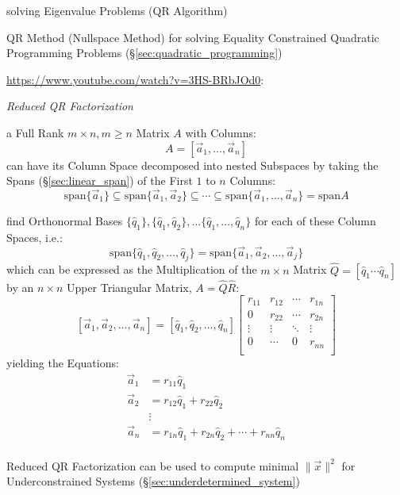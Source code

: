solving Eigenvalue Problems (QR Algorithm)

\fist QR Method (Nullspace Method) for solving Equality Constrained Quadratic
Programming Problems (\S\ref{sec:quadratic_programming})


\url{https://www.youtube.com/watch?v=3HS-BRbJOd0}:

\emph{Reduced QR Factorization}

a Full Rank $m \times n, m \geq n$ Matrix $A$ with Columns:
\[
  A = [ \vec{a}_1, \ldots, \vec{a}_n ]
\]
can have its Column Space decomposed into nested Subspaces by taking the Spans
(\S\ref{sec:linear_span}) of the First $1$ to $n$ Columns:
\[
  \mathrm{span} \{ \vec{a}_1 \} \subseteq
  \mathrm{span} \{ \vec{a}_1, \vec{a}_2 \}
  \subseteq \cdots \subseteq
  \mathrm{span} \{ \vec{a}_1, \ldots, \vec{a}_n \}
  = \mathrm{span} A
\]

find Orthonormal Bases $\{ \hat{q}_1 \}, \{ \hat{q}_1, \hat{q}_2 \}, \ldots \{
\hat{q}_1, \ldots, \hat{q}_n\}$ for each of these Column Spaces, i.e.:
\[
  \mathrm{span} \{ \hat{q}_1, \hat{q}_2, \ldots, \hat{q}_j \} =
  \mathrm{span} \{ \vec{a}_1, \vec{a}_2, \ldots, \vec{a}_j \}
\]
which can be expressed as the Multiplication of the $m \times n$ Matrix
$\hat{Q} = [ \hat{q}_1 \cdots \hat{q}_n ]$ by an $n \times n$ Upper Triangular
Matrix, $A = \hat{Q}\hat{R}$:
\[
  [\vec{a}_1, \vec{a}_2, \ldots, \vec{a}_n] =
  [\hat{q}_1, \hat{q}_2, \ldots, \hat{q}_n]
  \begin{bmatrix}
    r_{11} & r_{12} & \cdots & r_{1n} \\
    0      & r_{22} & \cdots & r_{2n} \\
    \vdots & \vdots & \ddots & \vdots \\
    0      & \cdots & 0      & r_{nn} \\
  \end{bmatrix}
\]
yielding the Equations:
\begin{align*}
  \vec{a}_1 & = r_{11}\hat{q}_1 \\
  \vec{a}_2 & = r_{12}\hat{q}_1 + r_{22}\hat{q}_2 \\
            & \vdots \\
  \vec{a}_n & = r_{1n}\hat{q}_1 + r_{2n}\hat{q}_2 + \cdots + r_{nn}\hat{q}_n \\
\end{align*}

Reduced QR Factorization can be used to compute minimal $\|\vec{x}\|^2$ for
Underconstrained Systems (\S\ref{sec:underdetermined_system})


